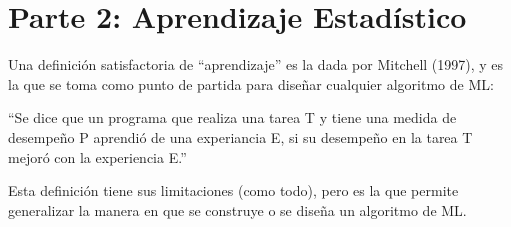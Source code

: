 \section{Parte 2: Aprendizaje Estadístico}

Una definición satisfactoria de ``aprendizaje'' es la dada por Mitchell (1997), y es la que se toma como punto de partida para diseñar cualquier algoritmo de ML:

``Se dice que un programa que realiza una tarea T y tiene una medida de desempeño P aprendió de una experiancia E, si su desempeño en la tarea T mejoró con la experiencia E.''

Esta definición tiene sus limitaciones (como todo), pero es la que permite generalizar la manera en que se construye o se diseña un algoritmo de ML.
